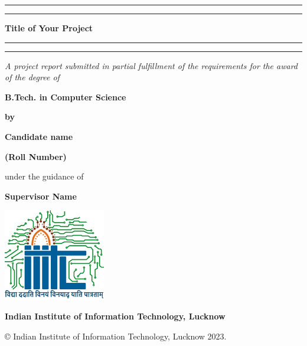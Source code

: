 \thispagestyle{empty}

\setcounter{page}{1}

\def\thepage{\roman{page}}

\begin{center}

    \rule[0.5ex]{\linewidth}{2pt}\vspace*{-\baselineskip}\vspace*{3.2pt}
    \rule[0.5ex]{\linewidth}{2pt}
    
    \vspace*{3.2pt}

    {\Large\bf Title of Your Project}

    \vspace*{3.2pt}
    
    \rule[0.5ex]{\linewidth}{2pt}\vspace*{-\baselineskip}\vspace*{3.2pt}
    \rule[0.5ex]{\linewidth}{2pt}
    
    \vspace{1.5cm}
    
    \textit{{A project report submitted in partial fulfillment of the requirements 
    for the award of the degree of}}
    
    \vspace{1cm}
    
    {\bf B.Tech. in Computer Science}
    
    \vspace{1cm}
    
    {\bf by}
    
    \vspace{0.8cm}
    
    {\bf {Candidate name}}
    
    \vspace{0.1cm}
    
    {\bf {(Roll Number)}}
    
    \vspace{1.8cm}
    
    {under the guidance of}
    
    \vspace{0.1cm}

        {\bf{Supervisor Name}}

    
    \vspace{1.8cm}
    
    \includegraphics[height=4cm]{./Images/Logo_IIITL.png}
    
    \vspace{.5cm}
    {\bf\large{Indian Institute of Information Technology, Lucknow}}\\
    {\bf{}}
\end{center}

\medskip

\centerline{ \copyright{} Indian Institute of Information Technology, Lucknow 2023.}

\cleardoublepage






